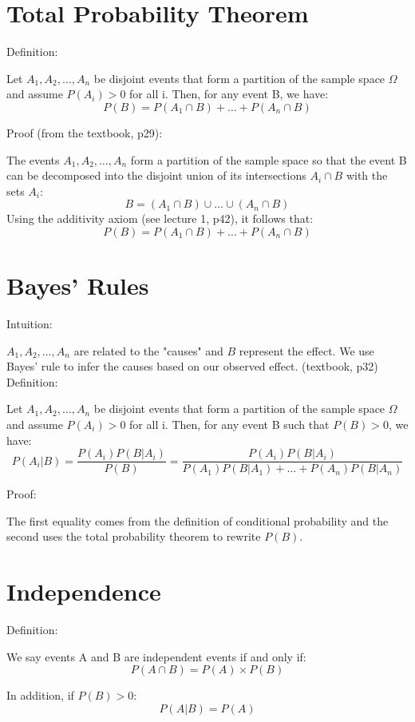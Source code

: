 \documentclass[11pt]{article}
\begin{document}
\section{Total Probability Theorem}
Definition:

Let $A_1, A_2, \ldots, A_n$ be disjoint events that form a partition of the sample space $\Omega$ and assume $P(A_i) > 0$ for all i. 
Then, for any event B, we have: 
$$P(B) = P(A_1 \cap B) + \ldots + P(A_n \cap B)$$

\noindent Proof (from the textbook, p29):

The events $A_1, A_2, \ldots, A_n$ form a partition of the sample space so that the event B can be decomposed into the disjoint union of its intersections $A_i \cap B$ with the sets $A_i$:
$$ B = (A_1 \cap B) \cup \ldots \cup (A_n \cap B)$$
Using the additivity axiom (see lecture 1, p42), it follows that:
$$ P(B) = P(A_1 \cap B) + \ldots + P(A_n \cap B)$$

\section{Bayes' Rules}
Intuition:

$A_1, A_2, \ldots, A_n$ are related to the "causes" and $B$ represent the effect.
We use Bayes' rule to infer the causes based on our observed effect. (textbook, p32) \newline
\newline \noindent Definition:

Let $A_1, A_2, \ldots, A_n$ be disjoint events that form a partition of the sample space $\Omega$ and assume $P(A_i) > 0$ for all i. 
Then, for any event B such that $P(B) > 0$, we have: 
$$P(A_i | B) = \frac{P(A_i)P(B | A_i)}{P(B)} = \frac{P(A_i)P(B | A_i)}{P(A_1)P(B | A_1) + \ldots + P(A_n)P(B | A_n)}$$

\noindent Proof:

The first equality comes from the definition of conditional probability and the second uses the total probability theorem to rewrite $P(B)$. 

\section{Independence}
Definition:

We say events A and B are independent events if and only if:
$$ P(A \cap B) = P(A) \times P(B)$$

In addition, if $P(B) > 0$:
$$P(A | B) = P(A)$$
\end{document}
